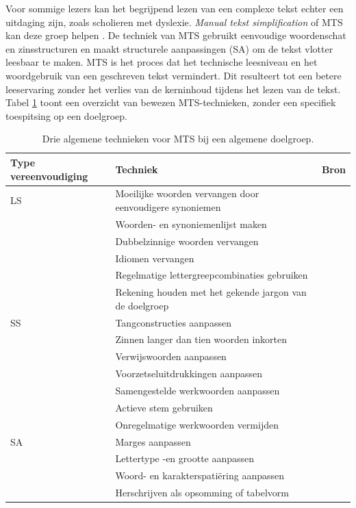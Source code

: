 Voor sommige lezers kan het begrijpend lezen van een complexe tekst echter een uitdaging zijn, zoals scholieren met dyslexie. \textit{Manual tekst simplification} of MTS kan deze groep helpen \autocite{Siddharthan2014}. De techniek van MTS gebruikt eenvoudige woordenschat en zinsstructuren en maakt structurele aanpassingen (SA) om de tekst vlotter leesbaar te maken. MTS is het proces dat het technische leesniveau en het woordgebruik van een geschreven tekst vermindert. Dit resulteert tot een betere leeservaring zonder het verlies van de kerninhoud tijdens het lezen van de tekst. Tabel \ref{table:manual-simplification} toont een overzicht van bewezen MTS-technieken, zonder een specifiek toespitsing op een doelgroep.

\begin{center}
		\begin{table}[H]
			\begin{tabular}{ | m{2.5cm} | m{8cm} | m{4.5cm} | } 
			\hline
			\textbf{Type vereenvoudiging} & \textbf{Techniek} & \textbf{Bron} \\ \hline
			
			LS & Moeilijke woorden vervangen door eenvoudigere synoniemen & \autocite{Crossley2012, Rello2013c, Siddharthan2014} \\ 
				& Woorden- en synoniemenlijst maken & \autocite{Siddharthan2006, Bosmans2022b} \\
				& Dubbelzinnige woorden vervangen & \\
				& Idiomen vervangen & \autocite{Siddharthan2006} \\ 
				& Regelmatige lettergreepcombinaties gebruiken & \autocite{Gala2016} \\
				& Rekening houden met het gekende jargon van de doelgroep & \autocite{JavoureyDrevet2022} \\
			\hline
			SS & Tangconstructies aanpassen & \autocite{Bosmans2022c} \\
			& Zinnen langer dan tien woorden inkorten & \autocite{Siddharthan2014} \\
			& Verwijswoorden aanpassen & \autocite{Bosmans2022a} \\
			& Voorzetseluitdrukkingen aanpassen & \autocite{Rello2013d} \\
			& Samengestelde werkwoorden aanpassen & \autocite{Bosmans2022b} \\
			& Actieve stem gebruiken & \autocite{Ruelas2020} \\
			& Onregelmatige werkwoorden vermijden & \autocite{Rello2013d, Gala2016} \\
			\hline
			SA & Marges aanpassen & \autocite{Rello2013d} \\
			& Lettertype -en grootte aanpassen & \autocite{Rello2012a} \\
			& Woord- en karakterspatiëring aanpassen & \autocite{Rello2012a} \\
			& Herschrijven als opsomming of tabelvorm & \autocite{Rello2015} \\
			\hline
		\end{tabular}
		\caption{Drie algemene technieken voor MTS bij een algemene doelgroep.}
		\label{table:manual-simplification}
	\end{table}
\end{center}


